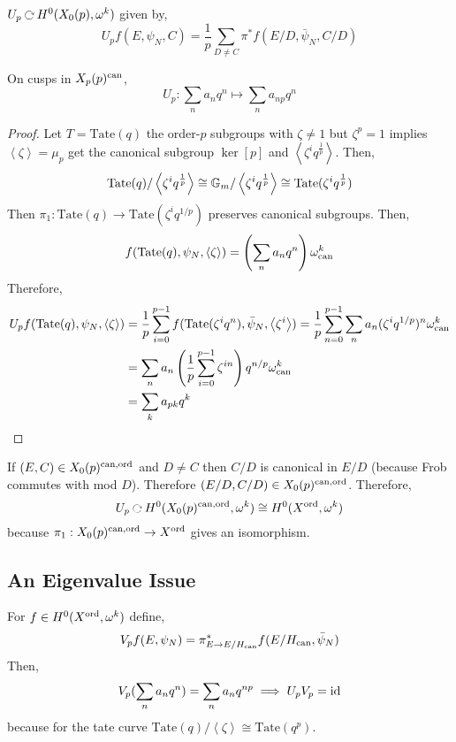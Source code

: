 \documentclass[12pt]{article}
\begin{document}
\begin{defn}
$U_p \acts H^0(X_0(p), \omega^k)$ given by,
\[ U_p f(E, \psi_N, C) = \frac{1}{p} \sum_{D \neq C} \pi^* f(E/D, \bar{\psi}_N, C/D) \]
\end{defn}

\begin{prop}
On cusps in $X_p(p)^{\mathrm{can}}$,
\[ U_p : \sum_n a_n q^n \mapsto \sum_n a_{np} q^n \]
\end{prop}

\newcommand{\Tate}{\mathrm{Tate}}

\begin{proof}
Let $T = \mathrm{Tate}(q)$ the order-$p$ subgroups with $\zeta \neq 1$ but $\zeta^p = 1$ implies $\left< \zeta \right> = \mu_p$ get the canonical subgroup $\ker{[p]}$ and $\left< \zeta^i q^{\frac{1}{p}} \right>$. Then,
\[ \mathrm{Tate}(q) / \left< \zeta^i q^{\frac{1}{p}} \right> \cong \mathbb{G}_m / \left< \zeta^i q^{\frac{1}{p}} \right> \cong \mathrm{Tate}(\zeta^i q^{\frac{1}{p}}) \]
Then $\pi_1 : \Tate(q) \to \Tate(\zeta^i q^{1/p})$ preserves canonical subgroups. Then,
\[ f(\Tate(q), \psi_N, \left< \zeta \right>) = \left( \sum_n a_n q^n \right) \omega_{\can}^k \]
Therefore,
\begin{align*}
U_p f(\Tate(q), \psi_N, \left< \zeta \right>) & = \frac{1}{p} \sum_{i = 0}^{p-1} f(\Tate(\zeta^i q^n), \bar{\psi}_N, \left< \zeta^i \right>) = \frac{1}{p} \sum_{n = 0}^{p-1} \sum_{n} a_n (\zeta^i q^{1/p})^n \omega_{\can}^k 
\\
& = \sum_n a_n \left( \frac{1}{p} \sum_{i = 0}^{p-1} \zeta^{in} \right) q^{n/p} \omega_{\can}^k
\\
& = \sum_k a_{pk} q^k 
\end{align*}
\end{proof}

If $(E, C) \in X_0(p)^{\mathrm{can}, \operatorname{\mathrm{ord}}}$ and $D \neq C$ then $C/D$ is canonical in $E / D$ (because Frob commutes with mod $D$). Therefore $(E/D, C/D) \in X_0(p)^{\mathrm{can}, \operatorname{\mathrm{ord}}}$. Therefore,
\[ U_p \acts H^0(X_0(p)^{\can, \ord}, \omega^k) \cong H^0(X^{\ord}, \omega^k) \]
because $\pi_1 : X_0(p)^{\mathrm{can}, \operatorname{\mathrm{ord}}} \to X^{\operatorname{\mathrm{ord}}}$ gives an isomorphism.

\subsection{An Eigenvalue Issue}

\begin{defn}
For $f \in H^0(X^{\operatorname{\mathrm{ord}}}, \omega^k)$ define,
\[ V_p f(E, \psi_N) = \pi^*_{E \to E/H_{\mathrm{can}}} f(E/H_{\mathrm{can}}, \bar{\psi}_N) \]
Then,
\[ V_p (\sum_n a_n q^n) = \sum_n a_n q^{np} \implies U_p V_p = \mathrm{id} \]
because for the tate curve $\Tate(q) / \left< \zeta \right> \cong \Tate(q^p)$. 
\end{defn}
\end{document}
